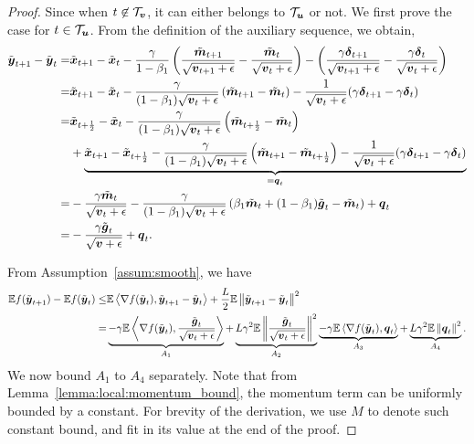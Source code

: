 \begin{proof}
Since when $t\not\in\mathcal{T}_{\boldsymbol{v}}$, it can either belongs to $\mathcal{T}_{\boldsymbol{u}}$ or not. We first prove the case for $t\in\mathcal{T}_{\boldsymbol{u}}$.
From the definition of the auxiliary sequence, we obtain,
\begin{align*}
    \tilde{\boldsymbol{y}}_{t+1} - \tilde{\boldsymbol{y}}_t = & \tilde{\boldsymbol{x}}_{t+1} - \tilde{\boldsymbol{x}}_t - \frac{\gamma}{1- \beta_1} \left(\frac{\tilde{\boldsymbol{m}}_{t+1}}{\sqrt{\boldsymbol{v}_{t+1}+\epsilon}} - \frac{\tilde{\boldsymbol{m}}_{t}}{\sqrt{\boldsymbol{v}_{t}+\epsilon}} \right) - \left( \frac{\gamma\boldsymbol{\delta}_{t+1}}{\sqrt{\boldsymbol{v}_{t+1}+\epsilon}} - \frac{\gamma\boldsymbol{\delta}_{t}}{\sqrt{\boldsymbol{v}_{t}+\epsilon}}\right) \\
= & \tilde{\boldsymbol{x}}_{t+1} - \tilde{\boldsymbol{x}}_t - \frac{\gamma}{(1- \beta_1)\sqrt{\boldsymbol{v}_t+\epsilon}} \left(\tilde{\boldsymbol{m}}_{t+1} - \tilde{\boldsymbol{m}}_{t} \right) - \frac{1}{\sqrt{\boldsymbol{v}_t+\epsilon}}(\gamma\boldsymbol{\delta}_{t+1} - \gamma\boldsymbol{\delta}_{t}) \\
    = & \tilde{\boldsymbol{x}}_{t+\frac{1}{2}} - \tilde{\boldsymbol{x}}_t - \frac{\gamma}{(1- \beta_1)\sqrt{\boldsymbol{v}_t+\epsilon}} \left(\tilde{\boldsymbol{m}}_{t+\frac{1}{2}} - \tilde{\boldsymbol{m}}_{t} \right) \\
        & + \underbrace{\tilde{\boldsymbol{x}}_{t+1} - \tilde{\boldsymbol{x}}_{t+\frac{1}{2}} - \frac{\gamma}{(1- \beta_1)\sqrt{\boldsymbol{v}_t+\epsilon}} \left(\tilde{\boldsymbol{m}}_{t+1} - \tilde{\boldsymbol{m}}_{t+\frac{1}{2}} \right) - \frac{1}{\sqrt{\boldsymbol{v}_t+\epsilon}}(\gamma\boldsymbol{\delta}_{t+1} - \gamma\boldsymbol{\delta}_{t})}_{=\boldsymbol{q}_t} \\
    = & -\frac{\gamma\tilde{\boldsymbol{m}}_t}{\sqrt{\boldsymbol{v}_t+\epsilon}} - \frac{\gamma}{(1- \beta_1)\sqrt{\boldsymbol{v}_t+\epsilon}} \left(\beta_1\tilde{\boldsymbol{m}}_{t} + (1-\beta_1)\tilde{\boldsymbol{g}}_t - \tilde{\boldsymbol{m}}_{t} \right) + \boldsymbol{q}_t \\
= & -\frac{\gamma\tilde{\boldsymbol{g}}_t}{\sqrt{\boldsymbol{v}+\epsilon}} + \boldsymbol{q}_t.
\end{align*}

From Assumption~\ref{assum:smooth}, we have
\begin{align*}
    \mathbb E f(\tilde{\boldsymbol{y}}_{t+1}) - \mathbb Ef(\tilde{\boldsymbol{y}}_{t}) \leq & \mathbb E\left\langle \nabla f(\tilde{\boldsymbol{y}}_t), \tilde{\boldsymbol{y}}_{t+1} - \tilde{\boldsymbol{y}}_t \right\rangle + \frac{L}{2}\mathbb E\left\|\tilde{\boldsymbol{y}}_{t+1} - \tilde{\boldsymbol{y}}_t \right\|^2\\
=& \underbrace{-\gamma \mathbb E\left\langle \nabla f(\tilde{\boldsymbol{y}}_t), \frac{\tilde{\boldsymbol{g}}_{t}}{\sqrt{\boldsymbol{v}_t+\epsilon}}\right\rangle}_{A_1} + \underbrace{L\gamma^2\mathbb E\left\| \frac{\tilde{\boldsymbol{g}}_{t}}{\sqrt{\boldsymbol{v}_t+\epsilon}}\right\|^2}_{A_2} \underbrace{- \gamma \mathbb E\left\langle \nabla f(\tilde{\boldsymbol{y}}_t), \boldsymbol{q}_t \right\rangle}_{A_3} + \underbrace{L\gamma^2\mathbb E\left\| \boldsymbol{q}_t\right\|^2}_{A_4}.
\end{align*}
We now bound $A_1$ to $A_4$ separately. Note that from Lemma~\ref{lemma:local:momentum_bound}, the momentum term can be uniformly bounded by a constant. For brevity of the derivation, we use $M$ to denote such constant bound, and fit in its value at the end of the proof.


\end{proof}
